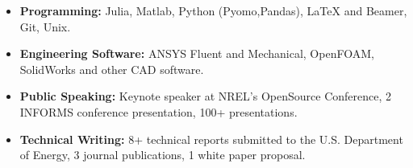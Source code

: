 \documentclass[5pt,a4paper,sans]{moderncv}
\begin{document}
	\begin{itemize}
		\item[]{\textbf{Programming:} Julia, Matlab, Python (Pyomo,Pandas), LaTeX and Beamer, Git, Unix.}		
		\item[]{\textbf{Engineering Software:} ANSYS Fluent and Mechanical, OpenFOAM, SolidWorks and other CAD software.}
		\item[]{\textbf{Public Speaking:} Keynote speaker at NREL's OpenSource Conference, 2 INFORMS conference presentation, 100+ presentations. 
		}
		\item[]{\textbf{Technical Writing:} 8+ technical reports submitted to the U.S. Department of Energy, 3 journal publications, 1 white paper proposal. 
		}
		
		
	\end{itemize}
	
\end{document}
